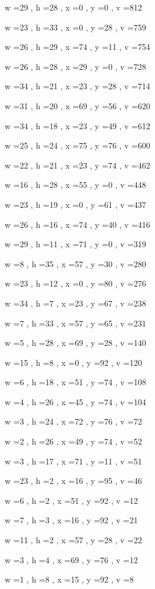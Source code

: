 \documentclass[11pt]{article}
\begin{document}
w =29 , h =28 , x =0 , y =0 , v =812
\par
w =23 , h =33 , x =0 , y =28 , v =759
\par
w =26 , h =29 , x =74 , y =11 , v =754
\par
w =26 , h =28 , x =29 , y =0 , v =728
\par
w =34 , h =21 , x =23 , y =28 , v =714
\par
w =31 , h =20 , x =69 , y =56 , v =620
\par
w =34 , h =18 , x =23 , y =49 , v =612
\par
w =25 , h =24 , x =75 , y =76 , v =600
\par
w =22 , h =21 , x =23 , y =74 , v =462
\par
w =16 , h =28 , x =55 , y =0 , v =448
\par
w =23 , h =19 , x =0 , y =61 , v =437
\par
w =26 , h =16 , x =74 , y =40 , v =416
\par
w =29 , h =11 , x =71 , y =0 , v =319
\par
w =8 , h =35 , x =57 , y =30 , v =280
\par
w =23 , h =12 , x =0 , y =80 , v =276
\par
w =34 , h =7 , x =23 , y =67 , v =238
\par
w =7 , h =33 , x =57 , y =65 , v =231
\par
w =5 , h =28 , x =69 , y =28 , v =140
\par
w =15 , h =8 , x =0 , y =92 , v =120
\par
w =6 , h =18 , x =51 , y =74 , v =108
\par
w =4 , h =26 , x =45 , y =74 , v =104
\par
w =3 , h =24 , x =72 , y =76 , v =72
\par
w =2 , h =26 , x =49 , y =74 , v =52
\par
w =3 , h =17 , x =71 , y =11 , v =51
\par
w =23 , h =2 , x =16 , y =95 , v =46
\par
w =6 , h =2 , x =51 , y =92 , v =12
\par
w =7 , h =3 , x =16 , y =92 , v =21
\par
w =11 , h =2 , x =57 , y =28 , v =22
\par
w =3 , h =4 , x =69 , y =76 , v =12
\par
w =1 , h =8 , x =15 , y =92 , v =8
\par
\newpage
\end{document}
